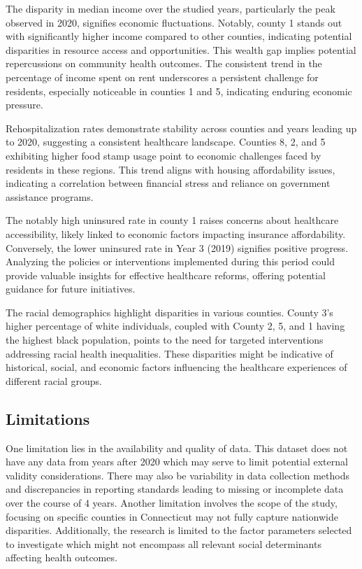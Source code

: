 \documentclass[12pt]{article}
\begin{document}
The disparity in median income over the studied years, particularly the peak observed in 2020, 
signifies economic fluctuations. Notably, county 1 stands out with significantly higher income 
compared to other counties, indicating potential disparities in resource access and opportunities. 
This wealth gap implies potential repercussions on community health outcomes. The consistent trend in 
the percentage of income spent on rent underscores a persistent challenge for residents, especially 
noticeable in counties 1 and 5, indicating enduring economic pressure.

Rehospitalization rates demonstrate stability across counties and years leading up to 2020, suggesting 
a consistent healthcare landscape. Counties 8, 2, and 5 exhibiting higher food stamp usage point to economic 
challenges faced by residents in these regions. This trend aligns with housing affordability issues, 
indicating a correlation between financial stress and reliance on government assistance programs.

The notably high uninsured rate in county 1 raises concerns about healthcare accessibility, likely 
linked to economic factors impacting insurance affordability. Conversely, the lower uninsured rate in 
Year 3 (2019) signifies positive progress. Analyzing the policies or interventions implemented during 
this period could provide valuable insights for effective healthcare reforms, offering potential guidance 
for future initiatives.

The racial demographics highlight disparities in various counties. County 3's higher percentage of white 
individuals, coupled with County 2, 5, and 1 having the highest black population, points to the need for
targeted interventions addressing racial health inequalities. These disparities might be indicative of 
historical, social, and economic factors influencing the healthcare experiences of different racial groups.

\subsection{Limitations}
One limitation lies in the availability and quality of data. This dataset does not have any 
data from years after 2020 which may serve to limit potential external validity considerations. 
There may also be variability in data collection methods and discrepancies in reporting standards 
leading to missing or incomplete data over the course of 4 years. Another limitation involves the scope 
of the study, focusing on specific counties in Connecticut may not fully capture nationwide disparities. 
Additionally, the research is limited to the factor parameters selected to investigate which  might not 
encompass all relevant social determinants affecting health outcomes.
\end{document}
